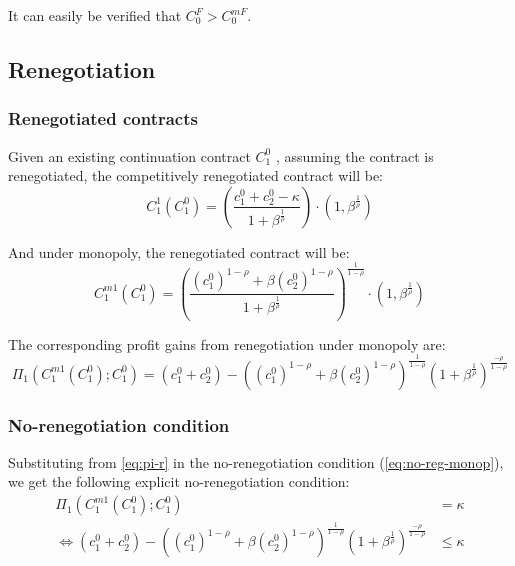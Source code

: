 \documentclass[11pt,english]{article}
\theoremstyle{plain}
\theoremstyle{definition}
\begin{document}
It can easily be verified that $C_{0}^{F}>C_{0}^{mF}$.

\subsection{Renegotiation }

\subsubsection{Renegotiated contracts}

Given an existing continuation contract $C_{1}^{0}$ , assuming the
contract is renegotiated, the competitively renegotiated contract
will be: 
\begin{equation}
C_{1}^{1}\left(C_{1}^{0}\right)=\left(\frac{c_{1}^{0}+c_{2}^{0}-\kappa}{1+\beta^{\frac{1}{\rho}}}\right)\cdot\left(1,\beta^{\frac{1}{\rho}}\right)\label{eq:c-r}
\end{equation}

And under monopoly, the renegotiated contract will be: 
\begin{equation}
C_{1}^{m1}\left(C_{1}^{0}\right)=\left(\frac{(c_{1}^{0})^{1-\rho}+\beta(c_{2}^{0})^{1-\rho}}{1+\beta^{\frac{1}{\rho}}}\right)^{\frac{1}{1-\rho}}\cdot\left(1,\beta^{\frac{1}{\rho}}\right)\label{eq:m-r}
\end{equation}

The corresponding profit gains from renegotiation under monopoly are:
\begin{equation}
\Pi_{1}\left(C_{1}^{m1}\left(C_{1}^{0}\right);C_{1}^{0}\right)=\left(c_{1}^{0}+c_{2}^{0}\right)-\left((c_{1}^{0})^{1-\rho}+\beta(c_{2}^{0})^{1-\rho}\right)^{\frac{1}{1-\rho}}\left(1+\beta^{\frac{1}{\rho}}\right)^{\frac{-\rho}{1-\rho}}\label{eq:pi-r}
\end{equation}

\subsubsection{No-renegotiation condition}

Substituting from \ref{eq:pi-r} in the no-renegotiation condition
(\ref{eq:no-reg-monop}), we get the following explicit no-renegotiation
condition: 
\begin{align}
\Pi_{1}\left(C_{1}^{m1}\left(C_{1}^{0}\right);C_{1}^{0}\right) & =\kappa\nonumber \\
\Longleftrightarrow\left(c_{1}^{0}+c_{2}^{0}\right)-\left((c_{1}^{0})^{1-\rho}+\beta(c_{2}^{0})^{1-\rho}\right)^{\frac{1}{1-\rho}}\left(1+\beta^{\frac{1}{\rho}}\right)^{\frac{-\rho}{1-\rho}} & \leq\kappa\label{eq:no-renegotiation}
\end{align}
\end{document}
